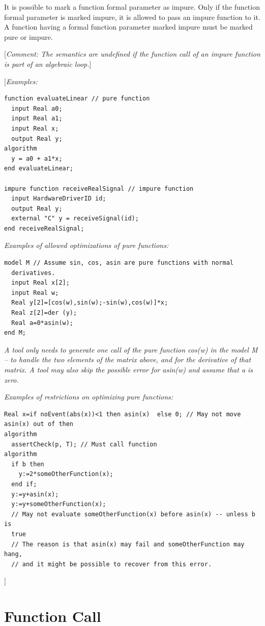 \documentclass[10pt,a4paper]{report}
\def\doublelabel#1{\label{#1}\hypertarget{#1}{}}
\begin{document}
It is possible to mark a function formal parameter as impure. Only if
the function formal parameter is marked impure, it is allowed to pass an
impure function to it. A function having a formal function parameter
marked impure must be marked pure or impure.

{[}\emph{Comment: The semantics are undefined if the function call of an
impure function is part of an algebraic loop.}{]}

{[}\emph{Examples:}

\begin{lstlisting}[language=modelica]
function evaluateLinear // pure function
  input Real a0;
  input Real a1;
  input Real x;
  output Real y;
algorithm
  y = a0 + a1*x;
end evaluateLinear;

impure function receiveRealSignal // impure function
  input HardwareDriverID id;
  output Real y;
  external "C" y = receiveSignal(id);
end receiveRealSignal;
\end{lstlisting}
\emph{Examples of allowed optimizations of pure functions:}

\begin{lstlisting}[language=modelica]
model M // Assume sin, cos, asin are pure functions with normal
  derivatives.
  input Real x[2];
  input Real w;
  Real y[2]=[cos(w),sin(w);-sin(w),cos(w)]*x;
  Real z[2]=der (y);
  Real a=0*asin(w);
end M;
\end{lstlisting}
\emph{A tool only needs to generate one call of the pure function cos(w)
in the model M -- to handle the two elements of the matrix above, and
for the derivative of that matrix. A tool may also skip the possible
error for asin(w) and assume that a is zero.}

\emph{Examples of restrictions on optimizing pure functions:}

\begin{lstlisting}[language=modelica]
  Real x=if noEvent(abs(x))<1 then asin(x)  else 0; // May not move asin(x) out of then
algorithm
  assertCheck(p, T); // Must call function
algorithm
  if b then
    y:=2*someOtherFunction(x);
  end if;
  y:=y+asin(x);
  y:=y+someOtherFunction(x);
  // May not evaluate someOtherFunction(x) before asin(x) -- unless b is
  true
  // The reason is that asin(x) may fail and someOtherFunction may hang,
  // and it might be possible to recover from this error.
\end{lstlisting}
{]}

\section{Function Call}\doublelabel{function-call}
\end{document}
